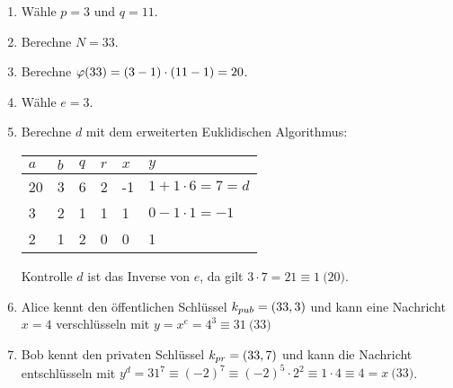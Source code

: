 \begin{example}\mbox{}
  \begin{enumerate}
    \item Wähle $p = 3$ und $q = 11$.
    \item Berechne $N = 33$.
    \item Berechne $\varphi(33) = (3 - 1) \cdot (11 - 1) = 20$.
    \item Wähle $e = 3$.
    \item Berechne $d$ mit dem erweiterten Euklidischen Algorithmus:
          \begin{center}
            \begin{tabular}{|l|l|l|l|l|l|}
              \hline
              $a$ & $b$ & $q$ & $r$ & $x$ & $y$                     \\ \hline
              20  & 3   & 6   & 2   & -1  & $1 + 1 \cdot 6 = 7 = d$ \\ \hline
              3   & 2   & 1   & 1   & 1   & $0 - 1 \cdot 1 = -1$    \\ \hline
              2   & 1   & 2   & 0   & 0   & 1                       \\ \hline
            \end{tabular}
          \end{center}
          Kontrolle $d$ ist das Inverse von $e$, da gilt $3 \cdot 7 = 21 \equiv 1 \pod{20}$.
    \item Alice kennt den öffentlichen Schlüssel $k_{pub} = (33,3)$ und kann eine
          Nachricht $x = 4$ verschlüsseln mit $y = x^e = 4^3 \equiv 31 \pod{33}$
    \item Bob kennt den privaten Schlüssel $k_{pr} = (33,7)$ und kann die Nachricht
          entschlüsseln mit $y^d = 31^7 \equiv (-2)^7 \equiv (-2)^5 \cdot 2^2 \equiv
            1 \cdot 4 \equiv 4 = x \pod{33}$.
  \end{enumerate}
\end{example}
